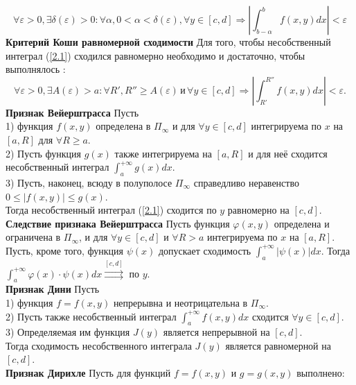 \documentclass{article}
\begin{document}
	\begin{equation}
	\label{2.3}
	\forall \varepsilon>0, \exists \delta(\varepsilon)>0: \forall \alpha, 0<\alpha<\delta(\varepsilon), \forall y \in[c, d] \Rightarrow\left|\int_{b-\alpha}^{b} f(x, y) d x\right|<\varepsilon
	\end{equation}
	\textbf{Критерий Коши равномерной сходимости} Для того, чтобы несобственный интеграл (\ref{2.1}) сходился равномерно необходимо и достаточно, чтобы выполнялось :
	\begin{equation}
	\label{2.4}
	\forall \varepsilon>0, \exists A(\varepsilon)>a: \forall R',R''\ge A(\varepsilon)\,\text{и}\,\forall y\in[c,d] \Rightarrow |\int_{R'}^{R''} f(x,y)dx|<\varepsilon.
	\end{equation}
	\textbf{Признак Вейерштрасса} Пусть\\
	1) функция $f(x,y)$ определена в $\Pi_{\infty}$ и для $\forall y \in[c,d]$  интегрируема по $x$ на $[a, R]$ для $\forall R \geqslant a$.\\
	2) Пусть функция $g(x)$ также интегрируема на $[a, R]$ и для неё сходится несобственный интеграл $\int_{a}^{+\infty} g(x) d x$.\\
	3) Пусть, наконец, всюду в полуполосе $\Pi_{\infty}$ справедливо неравенство  $0 \leqslant|f(x, y)| \leqslant g(x)$. \\
	Тогда несобственный интеграл (\ref{2.1}) сходится по $y$ равномерно на $[c,d]$.\\
	\textbf{Следствие признака Вейерштрасса} Пусть функция $\varphi(x, y) $ определена и ограничена в $ \Pi_{\infty}$, и для $ \forall y \in[c, d] $ и $ \forall R>a $ интегрируема по $x$ на $ [a, R] $.  Пусть, кроме того, функция $ \psi(x) $ допускает сходимость $ \int_{a}^{+\infty}|\psi(x)| d x $. Тогда $ \int_{a}^{+\infty} \varphi(x) \cdot \psi(x) d x \stackrel{[c, d]}{\rightrightarrows}$ по $y$. \\
	\textbf{Признак Дини} Пусть \\
	1) функция $ f=f(x, y) $ непрерывна и неотрицательна в $ \Pi_{\infty} $. \\
	2) Пусть также несобственный интеграл $ \int_{a}^{+\infty} f(x, y) d x $ сходится $ \forall y \in[c, d] $. \\
	3) Определяемая им функция $ J(y) $ является непрерывной на $ [c, d] $. \\
	Тогда сходимость несобственного интеграла $ J(y) $ является равномерной на $ [c, d]$.\\ 
	\textbf{Признак Дирихле} Пусть для функций $ f=f(x, y) $ и $ g=g(x, y) $ выполнено:\\
\end{document}
